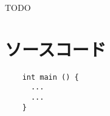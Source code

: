 \documentclass[master]{cimt}
\begin{document}
\maketitle 

\frontmatter{}

\begin{jabstract}
  
\end{jabstract}

\begin{eabstract}
  
\end{eabstract}

\setcounter{tocdepth}{2}
\tableofcontents

\mainmatter{}








\backmatter{}




\begin{acknowledgements}
TODO
\end{acknowledgements}

\appendix

\chapter{ソースコード}
  \begin{verbatim}
    int main () {
      ...
      ...
    }
  \end{verbatim}
\end{document}
